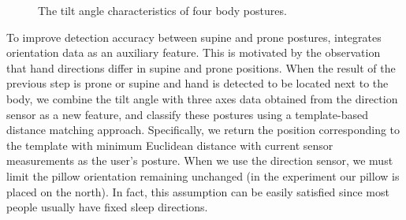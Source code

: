 \begin{figure}[!t]
	\centering
	\caption{The tilt angle characteristics of four body postures.}\label{fig:posture}
\end{figure}


To improve detection accuracy between supine and prone postures, {\systemname} integrates orientation data as an auxiliary feature. This is {motivated by the observation that hand directions differ in supine and prone positions}. When the result of the previous step is prone or supine and hand is detected to be located next to the body, we combine the tilt angle with three axes data obtained from the direction sensor as a new feature, and classify these postures using a template-based distance matching approach. Specifically, we return the position corresponding to the template with minimum Euclidean distance with current sensor measurements as the user's posture. When we use the direction sensor, we must limit the pillow orientation remaining unchanged (in the experiment our pillow is placed on the north). In fact, this assumption can be easily satisfied since most people usually have fixed sleep directions.


